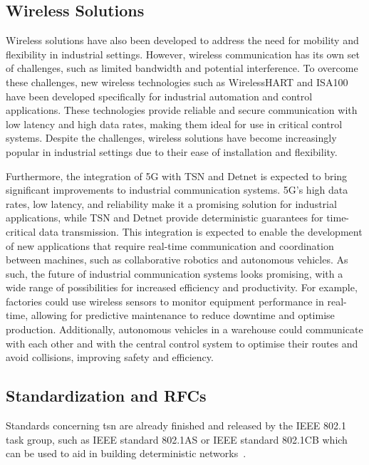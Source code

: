 \documentclass[runningheads]{llncs}
\begin{document}
\subsection*{Wireless Solutions}
Wireless solutions have also been developed to address the need for mobility and flexibility in industrial settings. However, wireless communication has its own set of challenges, such as limited bandwidth and potential interference. To overcome these challenges, new wireless technologies such as WirelessHART and ISA100 have been developed specifically for industrial automation and control applications. These technologies provide reliable and secure communication with low latency and high data rates, making them ideal for use in critical control systems. Despite the challenges, wireless solutions have become increasingly popular in industrial settings due to their ease of installation and flexibility.

Furthermore, the integration of 5G with TSN and Detnet is expected to bring significant improvements to industrial communication systems. 5G's high data rates, low latency, and reliability make it a promising solution for industrial applications, while TSN and Detnet provide deterministic guarantees for time-critical data transmission. This integration is expected to enable the development of new applications that require real-time communication and coordination between machines, such as collaborative robotics and autonomous vehicles. As such, the future of industrial communication systems looks promising, with a wide range of possibilities for increased efficiency and productivity. For example, factories could use wireless sensors to monitor equipment performance in real-time, allowing for predictive maintenance to reduce downtime and optimise production. Additionally, autonomous vehicles in a warehouse could communicate with each other and with the central control system to optimise their routes and avoid collisions, improving safety and efficiency.

\subsection*{Standardization and RFCs}
Standards concerning \gls{tsn} are already finished and released by the IEEE 802.1 task group, such as IEEE standard 802.1AS or IEEE standard 802.1CB which can be used to aid in building deterministic networks~\cite{Finn2018}.
\end{document}
